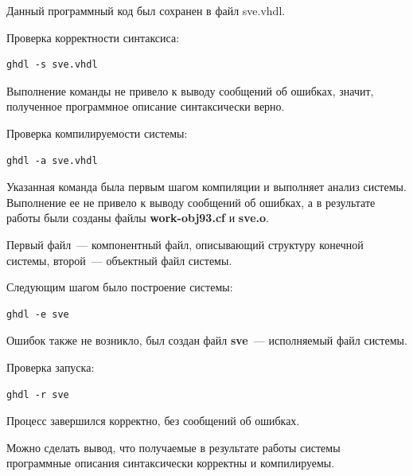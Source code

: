 Данный программный код был сохранен в файл sve.vhdl.

Проверка корректности синтаксиса:
\begin{lstlisting}
ghdl -s sve.vhdl
\end{lstlisting}

Выполнение команды не привело к выводу сообщений об ошибках, значит, полученное программное описание синтаксически верно.

Проверка компилируемости системы:
\begin{lstlisting}
ghdl -a sve.vhdl
\end{lstlisting}

Указанная команда была первым шагом компиляции и выполняет анализ системы.
Выполнение ее не привело к выводу сообщений об ошибках, а в результате работы были созданы файлы \textbf{work-obj93.cf} и \textbf{sve.o}.

Первый файл~--- компонентный файл, описывающий структуру конечной системы, второй~--- объектный файл системы.

Следующим шагом было построение системы:
\begin{lstlisting}
ghdl -e sve
\end{lstlisting}

Ошибок также не возникло, был создан файл \textbf{sve}~--- исполняемый файл системы.

Проверка запуска:
\begin{lstlisting}
ghdl -r sve
\end{lstlisting}

Процесс завершился корректно, без сообщений об ошибках.

Можно сделать вывод, что получаемые в результате работы системы программные описания синтаксически корректны и компилируемы.